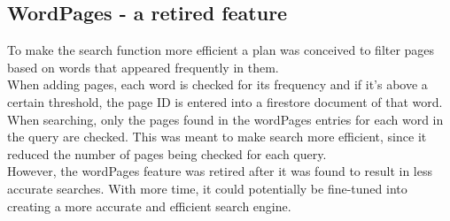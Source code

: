\subsection{WordPages - a retired feature}
To make the search function more efficient a plan was conceived to filter pages based on words that appeared frequently in them. \\
When adding pages, each word is checked for its frequency and if it's above a certain threshold, the page ID is entered into a firestore document of that word. \\
When searching, only the pages found in the wordPages entries for each word in the query are checked. This was meant to make search more efficient, since it reduced the number of pages being checked for each query. \\
However, the wordPages feature was retired after it was found to result in less accurate searches. With more time, it could potentially be fine-tuned into creating a more accurate and efficient search engine. 
